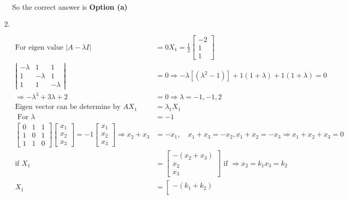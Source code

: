 \begin{enumerate}
\begin{answer}
\begin{align*}
		\end{align*}
		So the correct answer is \textbf{Option (a)}
	\end{answer}
	\item $\left. \right. $
	\begin{answer}
		\begin{align*}
		\text{For eigen value }|A-\lambda I|&=0
		X_{1}=\frac{1}{2}\left[\begin{array}{c}-2 \\ 1 \\ 1\end{array}\right]\\
		\left|\begin{array}{ccc}-\lambda & 1 & 1 \\ 1 & -\lambda & 1 \\ 1 & 1 & -\lambda\end{array}\right|&=0 \Rightarrow-\lambda\left[\left(\lambda^{2}-1\right)\right]+1(1+\lambda)+1(1+\lambda)=0\\
		\Rightarrow-\lambda^{3}+3 \lambda+2&=0 \Rightarrow \lambda=-1,-1,2\\
		\text{Eigen vector can be determine by }A X_{1}&=\lambda_{1} X_{1}\\
	\text{	For }\lambda&=-1\\
	\left[\begin{array}{lll}0 & 1 & 1 \\ 1 & 0 & 1 \\ 1 & 1 & 0\end{array}\right]\left[\begin{array}{l}x_{1} \\ x_{2} \\ x_{3}\end{array}\right]=-1\left[\begin{array}{c}x_{1} \\ x_{2} \\ x_{3}\end{array}\right] \Rightarrow x_{2}+x_{3}&=-x_{1}, \quad x_{1}+x_{3}=-x_{2}, x_{1}+x_{2}=-x_{3} \Rightarrow x_{1}+x_{2}+x_{3}=0\\
	\text{if }X_{1}&=\left[\begin{array}{c}-\left(x_{2}+x_{3}\right) \\ x_{2} \\ x_{3}\end{array}\right]\text{ if }\Rightarrow x_{2}=k_{1} x_{3}=k_{2}\\
	X_{1}&=\left[\begin{array}{c}
	-\left(k_{1}+k_{2}\right) \\

\end{array}
\end{align*}
\end{answer}
\end{enumerate}
